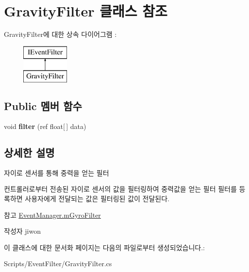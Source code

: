 \hypertarget{class_gravity_filter}{}\section{Gravity\+Filter 클래스 참조}
\label{class_gravity_filter}
Gravity\+Filter에 대한 상속 다이어그램 \+: \begin{figure}[H]
\begin{center}
\leavevmode
\includegraphics[height=2.000000cm]{class_gravity_filter}
\end{center}
\end{figure}
\subsection*{Public 멤버 함수}
\begin{DoxyCompactItemize}
\item 
\hypertarget{class_gravity_filter_ad397d715404a4057f13631b1b9978903}{}void {\bfseries filter} (ref float\mbox{[}$\,$\mbox{]} data)\label{class_gravity_filter_ad397d715404a4057f13631b1b9978903}

\end{DoxyCompactItemize}


\subsection{상세한 설명}
자이로 센서를 통해 중력을 얻는 필터

컨트롤러로부터 전송된 자이로 센서의 값을 필터링하여 중력값을 얻는 필터 필터를 등록하면 사용자에게 전달되는 값은 필터링된 값이 전달된다. \begin{DoxySeeAlso}{참고}
\hyperlink{class_event_manager_a7cee85488f5d7220c102cd945b1f494a}{Event\+Manager.\+m\+Gyro\+Filter} 
\end{DoxySeeAlso}
\begin{DoxyAuthor}{작성자}
jiwon 
\end{DoxyAuthor}


이 클래스에 대한 문서화 페이지는 다음의 파일로부터 생성되었습니다.\+:\begin{DoxyCompactItemize}
\item 
Scripts/\+Event\+Filter/Gravity\+Filter.\+cs\end{DoxyCompactItemize}
